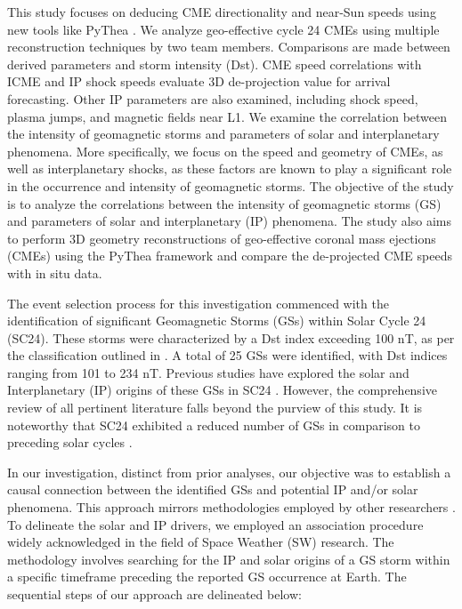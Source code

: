 This study focuses on deducing CME directionality and near-Sun speeds using new tools like PyThea \citep{kouloumvakos_2022}. We analyze geo-effective cycle 24 CMEs using multiple reconstruction techniques by two team members. Comparisons are made between derived parameters and storm intensity (Dst). CME speed correlations with ICME and IP shock speeds evaluate 3D de-projection value for arrival forecasting. Other IP parameters are also examined, including shock speed, plasma jumps, and magnetic fields near L1. We examine the correlation between the intensity of geomagnetic storms and parameters of solar and interplanetary phenomena. More specifically, we focus on the speed and geometry of CMEs, as well as interplanetary shocks, as these factors are known to play a significant role in the occurrence and intensity of geomagnetic storms. The objective of the study is to analyze the correlations between the intensity of geomagnetic storms (GS) and parameters of solar and interplanetary (IP) phenomena. The study also aims to perform 3D geometry reconstructions of geo-effective coronal mass ejections (CMEs) using the PyThea framework and compare the de-projected CME speeds with in situ data.

The event selection process for this investigation commenced with the identification of significant Geomagnetic Storms (GSs) within Solar Cycle 24 (SC24). These storms were characterized by a Dst index exceeding 100 nT, as per the classification outlined in \citet{gonzalez_1994}. A total of 25 GSs were identified, with Dst indices ranging from 101 to 234 nT. Previous studies have explored the solar and Interplanetary (IP) origins of these GSs in SC24 \citep{gopalswamy_gs_2022, qiu_2022, besliu_2022, abe_2023}. However, the comprehensive review of all pertinent literature falls beyond the purview of this study. It is noteworthy that SC24 exhibited a reduced number of GSs in comparison to preceding solar cycles \citep{selvakumaran_2016}.

In our investigation, distinct from prior analyses, our objective was to establish a causal connection between the identified GSs and potential IP and/or solar phenomena. This approach mirrors methodologies employed by other researchers \citep{zhang_2007, gonzalez_2007, gopalswamy_2008, echer_2013, manu_2022}. To delineate the solar and IP drivers, we employed an association procedure widely acknowledged in the field of Space Weather (SW) research. The methodology involves searching for the IP and solar origins of a GS storm within a specific timeframe preceding the reported GS occurrence at Earth. The sequential steps of our approach are delineated below:

